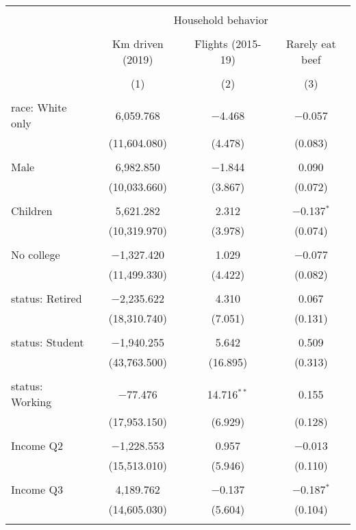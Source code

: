 
\begin{tabular}{@{\extracolsep{5pt}}lccc} 
\\[-1.8ex]\hline 
\hline \\[-1.8ex] 
 & \multicolumn{3}{c}{Household behavior} \\ 
\cline{2-4} 
\\[-1.8ex] & Km driven (2019) & Flights (2015-19) & Rarely eat beef \\ 
\\[-1.8ex] & (1) & (2) & (3)\\ 
\hline \\[-1.8ex] 
 race: White only & 6,059.768 & $-$4.468 & $-$0.057 \\ 
  & (11,604.080) & (4.478) & (0.083) \\ 
  & & & \\ 
 Male & 6,982.850 & $-$1.844 & 0.090 \\ 
  & (10,033.660) & (3.867) & (0.072) \\ 
  & & & \\ 
 Children & 5,621.282 & 2.312 & $-$0.137$^{*}$ \\ 
  & (10,319.970) & (3.978) & (0.074) \\ 
  & & & \\ 
 No college & $-$1,327.420 & 1.029 & $-$0.077 \\ 
  & (11,499.330) & (4.422) & (0.082) \\ 
  & & & \\ 
 status: Retired & $-$2,235.622 & 4.310 & 0.067 \\ 
  & (18,310.740) & (7.051) & (0.131) \\ 
  & & & \\ 
 status: Student & $-$1,940.255 & 5.642 & 0.509 \\ 
  & (43,763.500) & (16.895) & (0.313) \\ 
  & & & \\ 
 status: Working & $-$77.476 & 14.716$^{**}$ & 0.155 \\ 
  & (17,953.150) & (6.929) & (0.128) \\ 
  & & & \\ 
 Income Q2 & $-$1,228.553 & 0.957 & $-$0.013 \\ 
  & (15,513.010) & (5.946) & (0.110) \\ 
  & & & \\ 
 Income Q3 & 4,189.762 & $-$0.137 & $-$0.187$^{*}$ \\ 
  & (14,605.030) & (5.604) & (0.104) \\ 
  & & & \\ 

\end{tabular}
